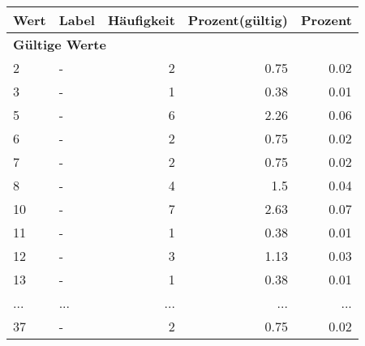      \begin{longtable}{lXrrr}
     \toprule
     \textbf{Wert} & \textbf{Label} & \textbf{Häufigkeit} & \textbf{Prozent(gültig)} & \textbf{Prozent} \\
     \endhead
     \midrule
     \multicolumn{5}{l}{\textbf{Gültige Werte}}\\
        2 & \multicolumn{1}{X}{-} & %
          \num{2} &
          \num[round-mode=places,round-precision=2]{0.75} &
          \num[round-mode=places,round-precision=2]{0.02} \\
        3 & \multicolumn{1}{X}{-} & %
          \num{1} &
          \num[round-mode=places,round-precision=2]{0.38} &
          \num[round-mode=places,round-precision=2]{0.01} \\
        5 & \multicolumn{1}{X}{-} & %
          \num{6} &
          \num[round-mode=places,round-precision=2]{2.26} &
          \num[round-mode=places,round-precision=2]{0.06} \\
        6 & \multicolumn{1}{X}{-} & %
          \num{2} &
          \num[round-mode=places,round-precision=2]{0.75} &
          \num[round-mode=places,round-precision=2]{0.02} \\
        7 & \multicolumn{1}{X}{-} & %
          \num{2} &
          \num[round-mode=places,round-precision=2]{0.75} &
          \num[round-mode=places,round-precision=2]{0.02} \\
        8 & \multicolumn{1}{X}{-} & %
          \num{4} &
          \num[round-mode=places,round-precision=2]{1.5} &
          \num[round-mode=places,round-precision=2]{0.04} \\
        10 & \multicolumn{1}{X}{-} & %
          \num{7} &
          \num[round-mode=places,round-precision=2]{2.63} &
          \num[round-mode=places,round-precision=2]{0.07} \\
        11 & \multicolumn{1}{X}{-} & %
          \num{1} &
          \num[round-mode=places,round-precision=2]{0.38} &
          \num[round-mode=places,round-precision=2]{0.01} \\
        12 & \multicolumn{1}{X}{-} & %
          \num{3} &
          \num[round-mode=places,round-precision=2]{1.13} &
          \num[round-mode=places,round-precision=2]{0.03} \\
        13 & \multicolumn{1}{X}{-} & %
          \num{1} &
          \num[round-mode=places,round-precision=2]{0.38} &
          \num[round-mode=places,round-precision=2]{0.01} \\
       ... & ... & ... & ... & ... \\
        37 & \multicolumn{1}{X}{-} & %
          \num{2} &
          \num[round-mode=places,round-precision=2]{0.75} &
          \num[round-mode=places,round-precision=2]{0.02} \\


\end{longtable}
